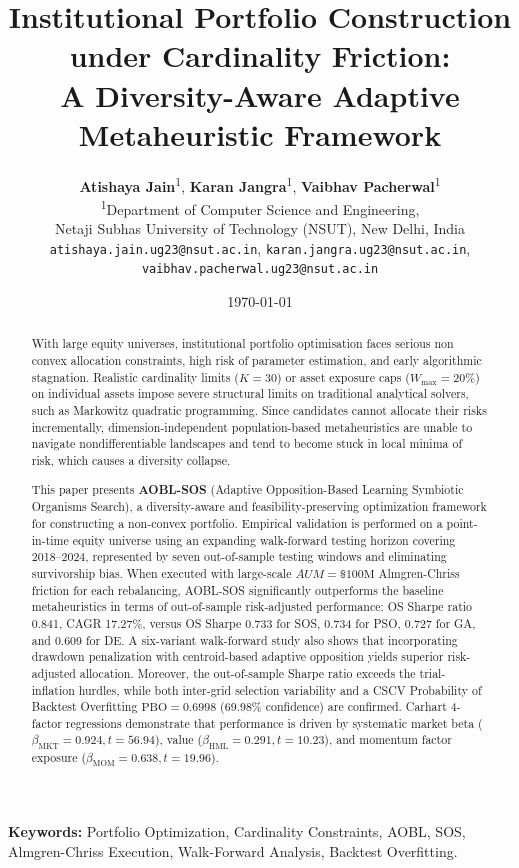 \documentclass[11pt,a4paper]{article}
\title{\textbf{Institutional Portfolio Construction under Cardinality Friction:\\A Diversity-Aware Adaptive Metaheuristic Framework}}
\author{
    \textbf{Atishaya Jain}\textsuperscript{1},
    \textbf{Karan Jangra}\textsuperscript{1},
    \textbf{Vaibhav Pacherwal}\textsuperscript{1}\\
    \small \textsuperscript{1}Department of Computer Science and Engineering,\\
    \small Netaji Subhas University of Technology (NSUT), New Delhi, India\\
    \small \texttt{atishaya.jain.ug23@nsut.ac.in},
    \texttt{karan.jangra.ug23@nsut.ac.in},
    \texttt{vaibhav.pacherwal.ug23@nsut.ac.in}
}
\date{\today}
\begin{document}
\maketitle

\begin{abstract}
With large equity universes, institutional portfolio optimisation faces serious non convex allocation constraints, high risk of parameter estimation, and early algorithmic stagnation. Realistic cardinality limits ($K=30$) or asset exposure caps ($W_{\max}=20\%$) on individual assets impose severe structural limits on traditional analytical solvers, such as Markowitz quadratic programming. Since candidates cannot allocate their risks incrementally, dimension-independent population-based metaheuristics are unable to navigate nondifferentiable landscapes and tend to become stuck in local minima of risk, which causes a diversity collapse.

This paper presents \textbf{AOBL-SOS} (Adaptive Opposition-Based Learning Symbiotic Organisms Search), a diversity-aware and feasibility-preserving optimization framework for constructing a non-convex portfolio. Empirical validation is performed on a point-in-time equity universe using an expanding walk-forward testing horizon covering 2018--2024, represented by seven out-of-sample testing windows and eliminating survivorship bias. When executed with large-scale $AUM = \$100\text{M}$ Almgren-Chriss friction for each rebalancing, AOBL-SOS significantly outperforms the baseline metaheuristics in terms of out-of-sample risk-adjusted performance: OS Sharpe ratio 0.841, CAGR 17.27\%, versus OS Sharpe 0.733 for SOS, 0.734 for PSO, 0.727 for GA, and 0.609 for DE. A six-variant walk-forward study also shows that incorporating drawdown penalization with centroid-based adaptive opposition yields superior risk-adjusted allocation. Moreover, the out-of-sample Sharpe ratio exceeds the trial-inflation hurdles, while both inter-grid selection variability and a CSCV Probability of Backtest Overfitting $\text{PBO} = 0.6998$ ($69.98\%$ confidence) are confirmed. Carhart 4-factor regressions demonstrate that performance is driven by systematic market beta ($\beta_{\text{MKT}} = 0.924, t=56.94$), value ($\beta_{\text{HML}} = 0.291, t=10.23$), and momentum factor exposure ($\beta_{\text{MOM}} = 0.638, t=19.96$).
\end{abstract}

\noindent \textbf{Keywords:} Portfolio Optimization, Cardinality Constraints, AOBL, SOS, Almgren-Chriss Execution, Walk-Forward Analysis, Backtest Overfitting.
\end{document}
